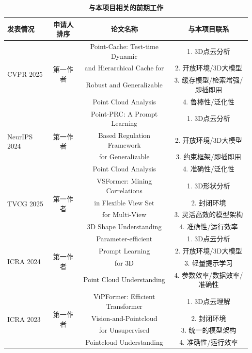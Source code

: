 \documentclass[12pt]{article}
\begin{document}
\begin{table}[ht]
   \footnotesize
   \centering
   \caption{\textbf{与本项目相关的前期工作}}
   \begin{tabular}{l c c c}
      \toprule
      \textbf{发表情况} & \textbf{申请人排序} & \textbf{论文名称} & \textbf{与本项目联系}\\
      \midrule
      \multirow{4}{*}{CVPR 2025} & \multirow{4}{*}{第一作者} & Point-Cache: Test-time Dynamic & 1. 3D点云分析 \\
      & & and Hierarchical Cache for  & 2. 开放环境/3D大模型 \\
      & & Robust and Generalizable & 3. 缓存模型/检索增强/即插即用 \\
      & & Point Cloud Analysis & 4. 鲁棒性/泛化性 \\
      \midrule
      \multirow{4}{*}{NeurIPS 2024} & \multirow{4}{*}{第一作者} & Point-PRC: A Prompt Learning   & 1. 3D点云分析 \\
      & & Based Regulation Framework   & 2. 开放环境/3D大模型 \\      
      & & for Generalizable & 3. 约束框架/即插即用 \\
      & & Point Cloud Analysis & 4. 准确性/泛化性 \\
      \midrule
      \multirow{4}{*}{TVCG 2025} & \multirow{4}{*}{第一作者} & VSFormer: Mining Correlations & 1. 3D形状分析 \\
      & & in Flexible View Set & 2. 封闭环境 \\
      & & for Multi-View & 3. 灵活高效的模型架构 \\
      & & 3D Shape Understanding & 4. 准确性/运行效率 \\
      \midrule
      \multirow{4}{*}{ICRA 2024} & \multirow{4}{*}{第一作者} & Parameter-efficient    & 1. 3D点云分析 \\
      & & Prompt Learning  & 2. 开放环境/3D大模型 \\
      & & for 3D & 3. 轻量提示学习 \\
      & & Point Cloud Understanding & 4. 参数效率/数据效率/准确性 \\
      \midrule
      \multirow{4}{*}{ICRA 2023} & \multirow{4}{*}{第一作者} & ViPFormer: Efficient  Transformer & 1. 3D点云理解 \\
      & & Vision-and-Pointcloud  & 2. 封闭环境 \\
      & & for Unsupervised & 3. 统一的模型架构 \\ %
      & & Pointcloud Understanding & 4. 准确性/运行效率 \\
      \bottomrule
   \end{tabular}
   \label{tab:research_foundation}
\end{table}
\end{document}
